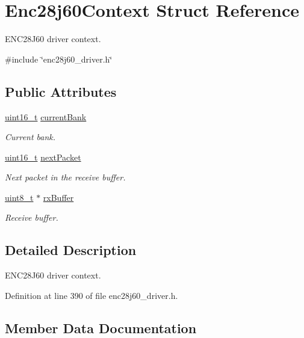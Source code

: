 \hypertarget{structEnc28j60Context}{}\section{Enc28j60\+Context Struct Reference}
\label{structEnc28j60Context}


E\+N\+C28\+J60 driver context.  




{\ttfamily \#include \char`\"{}enc28j60\+\_\+driver.\+h\char`\"{}}

\subsection*{Public Attributes}
\begin{DoxyCompactItemize}
\item 
\hyperlink{stdint_8h_a273cf69d639a59973b6019625df33e30}{uint16\+\_\+t} \hyperlink{structEnc28j60Context_a987ae13c8ce3236e2f76a012271dde69}{current\+Bank}
\begin{DoxyCompactList}\small\item\em Current bank. \end{DoxyCompactList}\item 
\hyperlink{stdint_8h_a273cf69d639a59973b6019625df33e30}{uint16\+\_\+t} \hyperlink{structEnc28j60Context_ac4411e438d3a831b59f26e147172e824}{next\+Packet}
\begin{DoxyCompactList}\small\item\em Next packet in the receive buffer. \end{DoxyCompactList}\item 
\hyperlink{stdint_8h_aba7bc1797add20fe3efdf37ced1182c5}{uint8\+\_\+t} $\ast$ \hyperlink{structEnc28j60Context_a5dec481de213c241d15d89e02ef38e1b}{rx\+Buffer}
\begin{DoxyCompactList}\small\item\em Receive buffer. \end{DoxyCompactList}\end{DoxyCompactItemize}


\subsection{Detailed Description}
E\+N\+C28\+J60 driver context. 

Definition at line 390 of file enc28j60\+\_\+driver.\+h.



\subsection{Member Data Documentation}
\mbox{\label{structEnc28j60Context_a987ae13c8ce3236e2f76a012271dde69}} 
